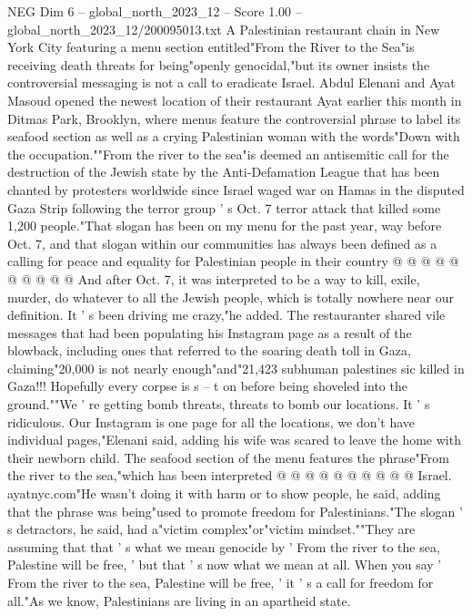 \begin{textsample}{NEG Dim 6 – global\_north\_2023\_12 – Score 1.00 – global\_north\_2023\_12/200095013.txt}  \label{ex:f6_neg_325}
A Palestinian restaurant chain in New York City featuring a menu section entitled"From the River to the Sea"is receiving death threats for being"openly genocidal,"but its owner insists the controversial messaging is not a call to eradicate Israel.
Abdul Elenani and Ayat Masoud opened the newest location of their restaurant Ayat earlier this month in Ditmas Park, Brooklyn, where menus feature the controversial phrase to label its seafood section as well as a crying Palestinian woman with the words"Down with the occupation.""From the river to the sea"is deemed an antisemitic call for the destruction of the Jewish state by the Anti-Defamation League that has been chanted by protesters worldwide since Israel waged war on Hamas in the disputed Gaza Strip following the terror group ' s Oct. 7 terror attack that killed some 1,200 people."That slogan has been on my menu for the past year, way before Oct. 7, and that slogan within our communities has always been defined as a calling for peace and equality for Palestinian people in their country @ @ @ @ @ @ @ @ @ @ And after Oct. 7, it was interpreted to be a way to kill, exile, murder, do whatever to all the Jewish people, which is totally nowhere near our definition.
It ' s been driving me crazy,"he added.
The restauranter shared vile messages that had been populating his Instagram page as a result of the blowback, including ones that referred to the soaring death toll in Gaza, claiming"20,000 is not nearly enough"and"21,423 subhuman palestines sic killed in Gaza!!!
Hopefully every corpse is s -- t on before being shoveled into the ground.""We ' re getting bomb threats, threats to bomb our locations.
It ' s ridiculous.
Our Instagram is one page for all the locations, we don't have individual pages,"Elenani said, adding his wife was scared to leave the home with their newborn child.
The seafood section of the menu features the phrase"From the river to the sea,"which has been interpreted @ @ @ @ @ @ @ @ @ @ Israel. ayatnyc.com"He wasn't doing it with harm or to show people, he said, adding that the phrase was being"used to promote freedom for Palestinians."The slogan ' s detractors, he said, had a"victim complex"or"victim mindset.""They are assuming that that ' s what we mean genocide by ' From the river to the sea, Palestine will be free, ' but that ' s now what we mean at all.
When you say ' From the river to the sea, Palestine will be free, ' it ' s a call for freedom for all."As we know, Palestinians are living in an apartheid state.

\end{textsample}
